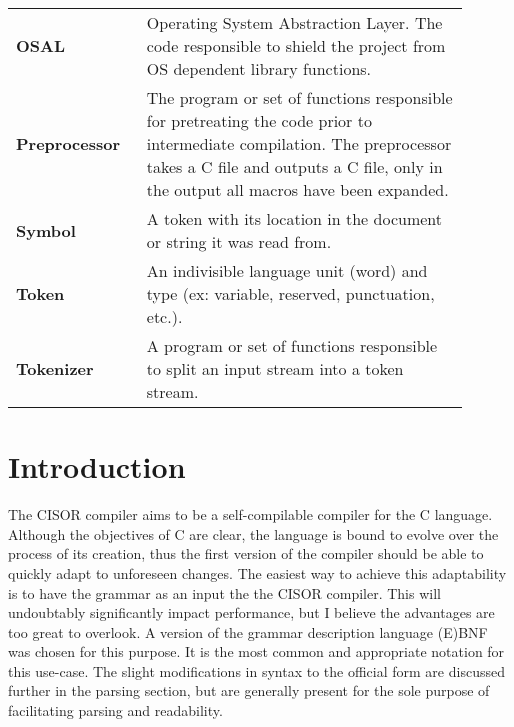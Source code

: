 \documentclass{article}
\newcommand{\csr}{C\raisebox{0.15em}{\textasteriskcentered}}
\begin{document}
\begin{longtable}{>{\bfseries}p{0.25\linewidth}p{0.65\linewidth}}
  OSAL & Operating System Abstraction Layer. The code responsible to shield the project from OS dependent library functions.\\
  Preprocessor & The program or set of functions responsible for pretreating the code prior to intermediate compilation. The preprocessor takes a \csr{} file and outputs a \csr{} file, only in the output all macros have been expanded.\\
  Symbol & A token with its location in the document or string it was read from.\\
  Token & An indivisible language unit (word) and type (ex: variable, reserved, punctuation, etc.).\\
  Tokenizer & A program or set of functions responsible to split an input stream into a token stream.
\end{longtable}

\pagebreak
{}

\section{Introduction}
The CISOR compiler aims to be a self-compilable compiler for the \csr{} language. Although the objectives of \csr{} are clear, the language is bound to evolve over the process of its creation, thus the first version of the compiler should be able to quickly adapt to unforeseen changes. The easiest way to achieve this adaptability is to have the grammar as an input the the CISOR compiler. This will undoubtably significantly impact performance, but I believe the advantages are too great to overlook. A version of the grammar description language (E)BNF was chosen for this purpose. It is the most common and appropriate notation for this use-case. The slight modifications in syntax to the official form are discussed further in the parsing section, but are generally present for the sole purpose of facilitating parsing and readability.
\end{document}
